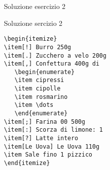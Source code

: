 \begin{frame}[fragile]{Soluzione esercizio 2}

\begin{block}{Soluzione sercizio 2}
\begin{lstlisting}
\begin{itemize}
\item[!] Burro 250g
\item[.] Zucchero a velo 200g
\item[,] Confettura 400g di
   \begin{enumerate}
   \item cipressi
   \item cipolle
   \item rosmarino
   \item \dots
   \end{enumerate}
\item[;] Farina 00 500g
\item[:] Scorza di limone: 1
\item[?] Latte intero
\item[Le Uova] Le Uova 110g
\item Sale fino 1 pizzico
\end{itemize}
\end{lstlisting}
\end{block}

\end{frame}